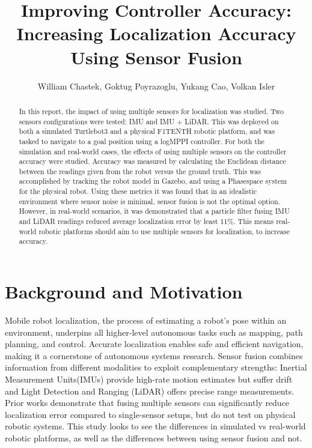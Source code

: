 \documentclass[10.5pt]{article}
\title{Improving Controller Accuracy: Increasing Localization Accuracy Using Sensor Fusion}
\author{William Chastek, Goktug Poyrazoglu, Yukang Cao, Volkan Isler\\}
\begin{document}
\maketitle

\begin{abstract}
In this report, the impact of using multiple sensors for localization was studied. Two sensors configurations were tested: IMU and IMU + LiDAR. This was deployed on both a simulated Turtlebot3 and a physical F1TENTH robotic platform, and was tasked to navigate to a goal position using a logMPPI controller. For both the simulation and real-world cases, the effects of using multiple sensors on the controller accuracy were studied. Accuracy was measured by calculating the Euclidean distance between the readings given from the robot versus the ground truth. This was accomplished by tracking the robot model in Gazebo, and using a Phasespace system for the physical robot. Using these metrics it was found that in an idealistic environment where sensor noise is minimal, sensor fusion is not the optimal option. However, in real-world scenarios, it was demonstrated that a particle filter fusing IMU and LiDAR readings reduced average localization error by least 11\%. This means real-world robotic platforms should aim to use multiple sensors for localization, to increase accuracy.
\end{abstract}

\section{Background and Motivation}
Mobile robot localization, the process of estimating a robot’s pose within an environment, underpins all higher-level autonomous tasks such as mapping, path planning, and control. Accurate localization enables safe and efficient navigation, making it a cornerstone of autonomous systems research. Sensor fusion combines information from different modalities to exploit complementary strengths: Inertial Measurement Units(IMUs) provide high-rate motion estimates but suffer drift and Light Detection and Ranging (LiDAR) offers precise range measurements. Prior works demonstrate that fusing multiple sensors can significantly reduce localization error compared to single-sensor setups\cite{Huang_Ye_Yang_Yu_2025}, but do not test on physical robotic systems. This study looks to see the differences in simulated vs real-world robotic platforms, as well as the differences between using sensor fusion and not.
\end{document}

